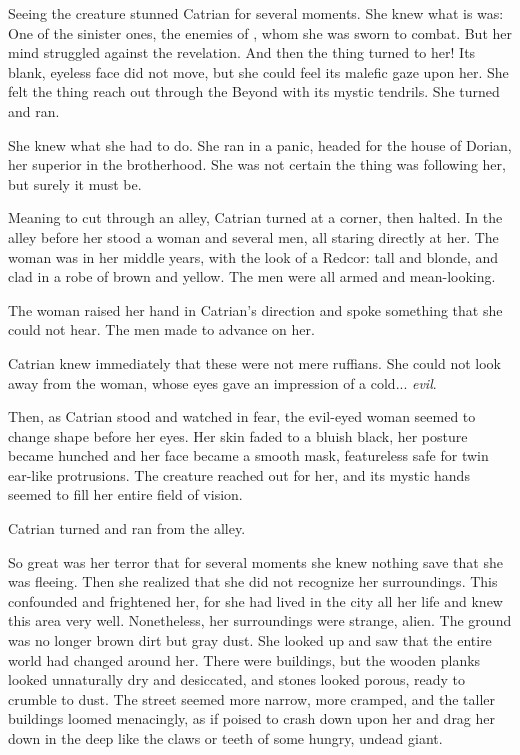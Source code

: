 Seeing the creature stunned Catrian for several moments. She knew what is was: One of the sinister ones, the enemies of \Miith{}, whom she was sworn to combat. But her mind struggled against the revelation. And then the thing turned to her! Its blank, eyeless face did not move, but she could feel its malefic gaze upon her. She felt the thing reach out through the Beyond with its mystic tendrils. She turned and ran. 

She knew what she had to do. 
She ran in a panic, headed for the house of \Mister{} Dorian, her superior in the brotherhood. She was not certain the thing was following her, but surely it must be. 

Meaning to cut through an alley, Catrian turned at a corner, then halted. In the alley before her stood a woman and several men, all staring directly at her. 
The woman was in her middle years, with the look of a Redcor: tall and blonde, and clad in a robe of brown and yellow. 
The men were all armed and mean-looking. 

The woman raised her hand in Catrian's direction and spoke something that she could not hear. The men made to advance on her.

Catrian knew immediately that these were not mere ruffians. 
She could not look away from the woman, whose eyes gave an impression of a cold... \emph{evil}. 

Then, as Catrian stood and watched in fear, the evil-eyed woman seemed to change shape before her eyes. 
Her skin faded to a bluish black, her posture became hunched and her face became a smooth mask, featureless safe for twin ear-like protrusions. 
The creature reached out for her, and its mystic hands seemed to fill her entire field of vision. 

Catrian turned and ran from the alley. 

So great was her terror that for several moments she knew nothing save that she was fleeing. Then she realized that she did not recognize her surroundings. This confounded and frightened her, for she had lived in the city all her life and knew this area very well.
Nonetheless, her surroundings were strange, alien. The ground was no longer brown dirt but gray dust. She looked up and saw that the entire world had changed around her. There were buildings, but the wooden planks looked unnaturally dry and desiccated, and stones looked porous, ready to crumble to dust. The street seemed more narrow, more cramped, and the taller buildings loomed menacingly, as if poised to crash down upon her and drag her down in the deep like the claws or teeth of some hungry, undead giant. 

